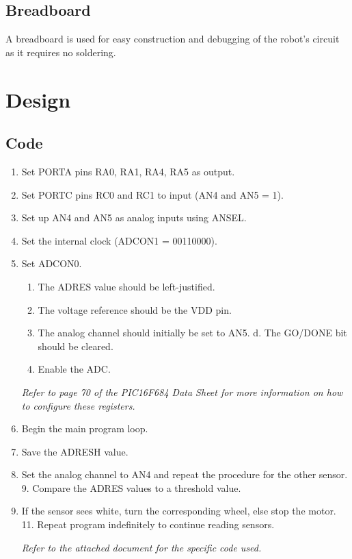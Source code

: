\documentclass[12pt]{article}
\begin{document}
\subsection{Breadboard}
A breadboard is used for easy construction and debugging of the robot’s circuit as it requires no soldering.

\section{Design}
\subsection{Code}
\begin{enumerate}
	\item Set PORTA pins RA0, RA1, RA4, RA5 as output.
	\item Set PORTC pins RC0 and RC1 to input (AN4 and AN5 = 1). \item Set up AN4 and AN5 as analog inputs using ANSEL.
	\item Set the internal clock (ADCON1 = 00110000).
	\item Set ADCON0.
	\begin{enumerate}
		\item The ADRES value should be left-justified.
		\item The voltage reference should be the VDD pin.
		\item The analog channel should initially be set to AN5. d. The GO/DONE bit should be cleared.
		\item Enable the ADC.
	\end{enumerate}
\textit{Refer to page 70 of the PIC16F684 Data Sheet for more information on how to configure these registers.}

	\item Begin the main program loop.
	\item Save the ADRESH value.
	\item Set the analog channel to AN4 and repeat the procedure for the other sensor. 9. Compare the ADRES values to a threshold value.
	\item If the sensor sees white, turn the corresponding wheel, else stop the motor. 11. Repeat program indefinitely to continue reading sensors.
	
\textit{Refer to the attached document for the specific code used.}
\end{enumerate}
\end{document}
